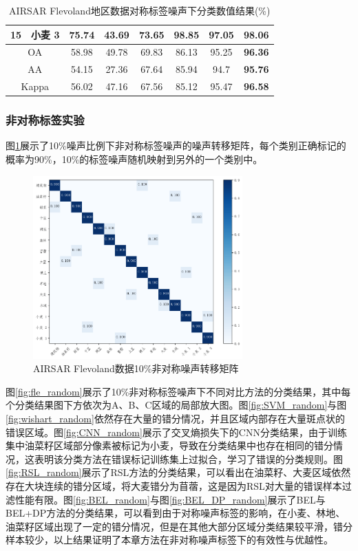 \begin{table}[ht!]
\begin{tabular}{cccccccc}
        15                        & 小麦 3  & 75.74 & 43.69   & 73.65 & \textbf{98.85} & 97.05          & 98.06          \\
        \midrule[0.75bp]
        \multicolumn{2}{c}{OA}    & 58.98 & 49.78 & 69.83   & 86.13 & 95.25          & \textbf{96.36}                  \\
        \multicolumn{2}{c}{AA}    & 54.15 & 27.36 & 67.64   & 85.94 & 94.7           & \textbf{95.76}                  \\
        \multicolumn{2}{c}{Kappa} & 56.02 & 47.16 & 67.56   & 85.12 & 95.47          & \textbf{96.58}                  \\
        \bottomrule[1.5bp]
    \end{tabular}
    \caption{AIRSAR Flevoland地区数据对称标签噪声下分类数值结果(\%)}
    \label{tab:fle_res_4}
\end{table}

\subsubsection{非对称标签实验}
图\ref{fig:fle_noise_random}展示了10\%噪声比例下非对称标签噪声的噪声转移矩阵，每个类别正确标记的概率为90\%，10\%的标签噪声随机映射到另外的一个类别中。
\begin{figure}[ht!]
    \centering
    \includegraphics[width=8.04cm]{pic/chapter4/fle/noise_random1.png}
    \caption{AIRSAR Flevoland数据10\%非对称噪声转移矩阵}
    \label{fig:fle_noise_random}
\end{figure}

图\ref{fig:fle_random}展示了10\%非对称标签噪声下不同对比方法的分类结果，其中每个分类结果图下方依次为A、B、C区域的局部放大图。图\ref{fig:SVM_random}与图\ref{fig:wishart_random}依然存在大量的错分情况，并且区域内部存在大量斑点状的错误区域。图\ref{fig:CNN_random}展示了交叉熵损失下的CNN分类结果，由于训练集中油菜籽区域部分像素被标记为小麦，导致在分类结果中也存在相同的错分情况，这表明该分类方法在错误标记训练集上过拟合，学习了错误的分类规则。图\ref{fig:RSL_random}展示了RSL方法的分类结果，可以看出在油菜籽、大麦区域依然存在大块连续的错分区域，将大麦错分为苜蓿，这是因为RSL对大量的错误样本过滤性能有限。图\ref{fig:BEL_random}与图\ref{fig:BEL_DP_random}展示了BEL与BEL+DP方法的分类结果，可以看到由于对称噪声标签的影响，在小麦、林地、油菜籽区域出现了一定的错分情况，但是在其他大部分区域分类结果较平滑，错分样本较少，以上结果证明了本章方法在非对称噪声标签下的有效性与优越性。

